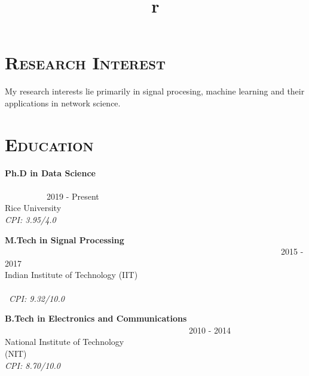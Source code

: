 \begin{resume}




\section{\textsc{Research Interest}}
My research interests lie primarily in signal procesing, machine learning and their applications in network science.

\section{\textsc{Education}}
\textbf{Ph.D in Data Science} \ \ \ \ \ \ \ \ \ \ \ \ \ \ \ \ \ \ \ \ \ \ \ \ \ \ \ \ \ \ \ \ \ \ \ \ \ \ \ \ \ \ \ \ \ \ \ \ \ \ \ \ \ \ \ \ \ \ \ \ \ \ \ \ \ \ \ \ \ \ \ \ \ \ \ \ \ \ \ \ \ \ 2019 - Present  \\
Rice University \ \ \ \ \ \ \ \ \ \ \ \ \ \ \ \ \ \ \ \ \ \ \ \ \ \ \ \ \ \ \ \ \ \ \ \ \ \ \ \ \ \ \ \ \ \\
\textit{CPI: 3.95/4.0}

\textbf{M.Tech in Signal Processing} \ \ \ \ \ \ \ \ \ \ \ \ \ \ \ \ \ \ \ \ \ \ \ \ \ \ \ \ \ \ \ \ \ \ \ \ \ \ \ \ \ \ \ \ \ \ \ \ \ \ \ \ \ \ \ \ \ \ \ \ \ \ \ \ \ \ 2015 - 2017 \\
Indian Institute of Technology (IIT) \ \ \ \ \ \ \ \ \ \ \ \ \ \ \ \ \ \ \ \ \ \ \ \ \ \ \ \ \ \ \ \ \ \ \ \ \ \ \ \ \ \ \ \ \\\
\textit{CPI: 9.32/10.0}

\textbf{B.Tech in Electronics and Communications} \ \ \ \ \ \ \ \ \ \ \ \ \ \ \ \ \ \ \ \ \ \ \ \ \ \ \ \ \ \ \ \ \ \ \ \ \ \ \ \ \ \ \ \ 2010 - 2014 \\ 
National Institute of Technology (NIT)\ \ \ \ \ \ \ \ \ \ \ \ \ \ \ \ \ \ \ \ \ \ \ \ \ \ \ \ \ \ \ \ \ \ \ \ \ \ \ \ \\ 
\textit{CPI: 8.70/10.0} 


\begin{formatb}
  \title{r}\\
  \\ 
  
  \body\\
\end{formatb}


\end{resume}
